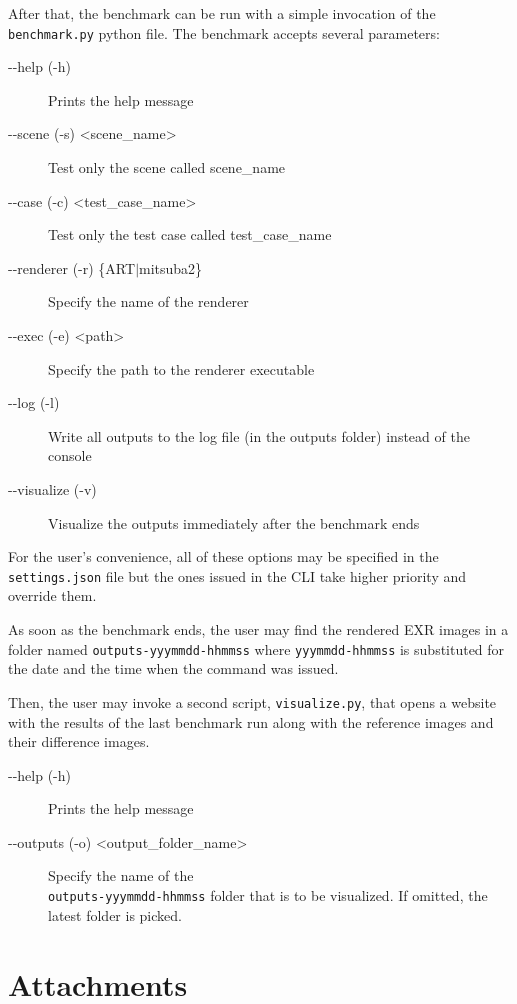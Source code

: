 \documentclass[12pt,a4paper]{report}
\begin{document}
After that, the benchmark can be run with a simple invocation of the \\ \texttt{benchmark.py} python file. 
The benchmark accepts several parameters:
\begin{description}
	\item[-{}-help (-h)] Prints the help message
	\item[-{}-scene (-s) \textless scene\_name\textgreater] Test only the scene called scene\_name
	\item[-{}-case (-c) \textless test\_case\_name\textgreater] Test only the test case called test\_case\_name
	\item[-{}-renderer (-r) \{ART\(|\)mitsuba2\}] Specify the name of the renderer 
	\item[-{}-exec (-e) \textless path\textgreater] Specify the path to the renderer executable
	\item[-{}-log (-l)] Write all outputs to the log file (in the outputs folder) instead of the console
	\item[-{}-visualize (-v)] Visualize the outputs immediately after the benchmark ends
\end{description}

For the user's convenience, all of these options may be specified in the \\ \texttt{settings.json} file but the ones issued in the CLI take higher priority and override them.

As soon as the benchmark ends, the user may find the rendered EXR images in a folder named \texttt{outputs-yyymmdd-hhmmss} where \texttt{yyymmdd-hhmmss} is substituted for the date and the time when the command was issued.

Then, the user may invoke a second script, \texttt{visualize.py}, that opens a website with the results of the last benchmark run along with the reference images and their difference images.

\begin{description}
	\item[-{}-help (-h)] Prints the help message
	\item[-{}-outputs (-o) \textless output\_folder\_name\textgreater] Specify the name of the\\ \texttt{outputs-yyymmdd-hhmmss} folder that is to be visualized. If omitted, the latest folder is picked.
\end{description}


\chapter{Attachments}
\end{document}
